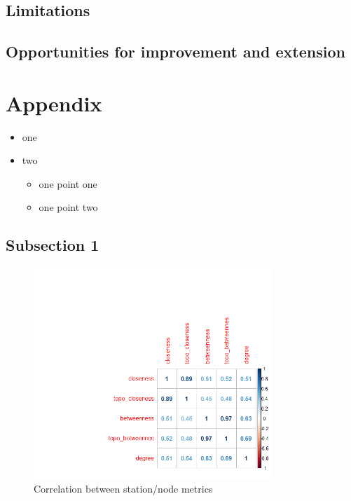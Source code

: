 \documentclass[11pt]{article} %
\begin{document}
\subsection{Limitations}

\subsection{Opportunities for improvement and extension}




\section{Appendix}




\begin{itemize}
\item one
\item two
  \begin{itemize}
  \item one point one
  \item one point two
  \end{itemize}
\end{itemize}

\subsection{Subsection 1}

\begin{figure}
\centering
\includegraphics[width=0.8\textwidth]{example}
\caption{Correlation between station/node metrics}
\end{figure}
\end{document}
